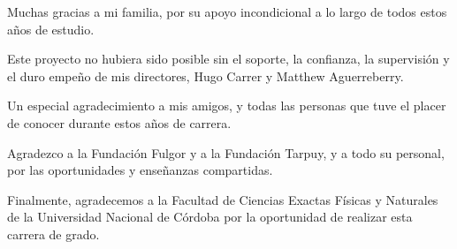 \documentclass[
11pt, %
spanish, %
singlespacing, %
headsepline, %
]{MastersDoctoralThesis} %
\begin{document}

 
\begin{acknowledgements}
	
	\addchaptertocentry{\acknowledgementname} %

	Muchas gracias a mi familia, por su apoyo incondicional a lo largo de todos estos años de estudio.  
	\bigskip
			
	Este proyecto no hubiera sido posible sin el soporte, la confianza, la supervisión y el duro empeño de mis directores, Hugo Carrer y Matthew Aguerreberry.
	\bigskip
			
	Un especial agradecimiento a mis amigos, y todas las personas que tuve el placer de conocer durante estos años de carrera.
	\bigskip
		
	Agradezco a la Fundación Fulgor y a la Fundación Tarpuy, y a todo su personal, por las oportunidades y enseñanzas compartidas.
	\bigskip
			
	Finalmente, agradecemos a la Facultad de Ciencias Exactas Físicas y Naturales de la Universidad Nacional de Córdoba por la oportunidad de realizar esta carrera de grado.

	\vspace*{\fill}
		
\end{acknowledgements}


\hypersetup{
	linkcolor=black,
	citecolor=black,
	urlcolor=black
	}

\tableofcontents %
\end{document}
